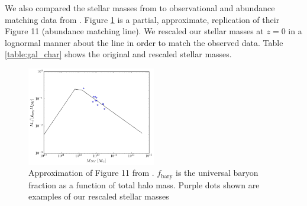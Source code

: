 \documentclass[fleqn,usenatbib,useAMS]{mnras}
\begin{document}
We also compared the stellar masses from \citet{2012MNRAS.425..641L} to  observational and abundance matching data from \citet{2018AstL...44....8K}. Figure \ref{fig:stellar1} is a partial, approximate, replication of their Figure 11 (abundance matching line).  We rescaled our stellar masses at $z=0$ in a lognormal manner about the line in order to match the observed data.  Table \ref{table:gal_char} shows the original and rescaled stellar masses.

\begin{figure}
\includegraphics[width=0.5\textwidth]{plots/stellar_to_halo_ratio.png}
\caption{Approximation of Figure 11 from \citet{2018AstL...44....8K}.  $f_\mathrm{bary}$ is the universal baryon fraction as a function of total halo mass.  Purple dots shown are examples of our rescaled stellar masses}
\label{fig:stellar1}
\end{figure}
\end{document}

